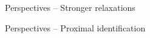 \begin{frame}{Perspectives -- Stronger relaxations}
\end{frame}

\begin{frame}{Perspectives -- Proximal identification}
\end{frame}

  
